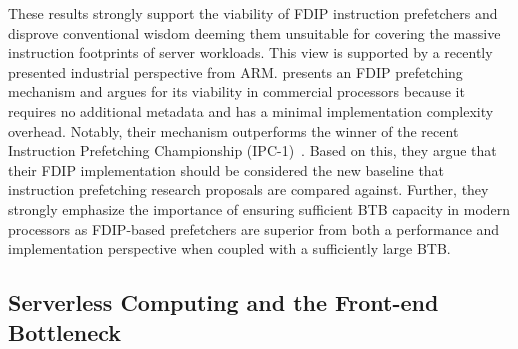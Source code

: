 \documentclass[../main.tex]{subfiles}
\begin{document}
\begin{refsection}
These results strongly support the viability of FDIP instruction
prefetchers and disprove conventional wisdom deeming them unsuitable
for covering the massive instruction footprints of server
workloads. This view is supported by a recently presented industrial
perspective from ARM. \textcite{ishii21_re_fetch_direc_instr_prefet}
presents an FDIP prefetching mechanism and argues for its viability in
commercial processors because it requires no additional metadata and
has a minimal implementation complexity overhead. Notably, their
mechanism outperforms the winner of the recent Instruction Prefetching
Championship (IPC-1)~\cite{ipc1}. Based on this, they argue that their
FDIP implementation should be considered the new baseline that
instruction prefetching research proposals are compared
against. Further, they strongly emphasize the importance of ensuring
sufficient BTB capacity in modern processors as FDIP-based prefetchers
are superior from both a performance and implementation perspective
when coupled with a sufficiently large BTB.

\subsection{Serverless Computing and the Front-end Bottleneck}













\ifx\chapincluded\undefined
  \printbibliography
  \end{refsection}
 \fi
\end{document}
